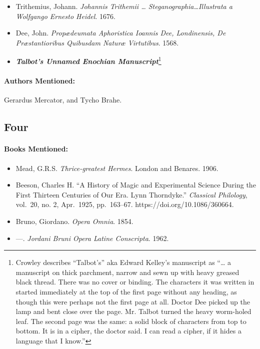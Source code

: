 \documentclass[12pt]{article}
\providecommand{\tightlist}{%
  \setlength{\itemsep}{0pt}\setlength{\parskip}{0pt}}
\begin{document}
\begin{itemize}
\tightlist
\item
  Trithemius, Johann. \emph{Johannis Trithemii \ldots{} Steganographia\ldots Illustrata a Wolfgango Ernesto Heidel}. 1676.
\item
  Dee, John. \emph{Propædeumata Aphoristica Ioannis Dee, Londinensis, De Præstantioribus Quibusdam Naturæ Virtutibus}. 1568.
\item
  \textbf{\emph{Talbot's Unnamed Enochian Manuscript}}\footnote{Crowley describes ``Talbot's'' aka Edward Kelley's manuscript as ``\ldots{} a manuscript on thick parchment, narrow and sewn up with heavy greased black thread. There was no cover or binding. The characters it was written in started immediately at the top of the first page without any heading, as though this were perhaps not the first page at all. Doctor Dee picked up the lamp and bent close over the page. Mr. Talbot turned the heavy worm-holed leaf. The second page was the same: a solid block of characters from top to bottom. It is in a cipher, the doctor said. I can read a cipher, if it hides a language that I know.''}
\end{itemize}

\paragraph{Authors Mentioned:}\label{authors-mentioned-7}

Gerardus Mercator, and Tycho Brahe.

\subsection{Four}\label{four-1}

\paragraph{Books Mentioned:}\label{books-mentioned-11}

\begin{itemize}
\tightlist
\item
  Mead, G.R.S. \emph{Thrice-greatest Hermes}. London and Benares. 1906.
\item
  Beeson, Charles H. ``A History of Magic and Experimental Science During the First Thirteen Centuries of Our Era. Lynn Thorndyke.'' \emph{Classical Philology}, vol.~20, no. 2, Apr.~1925, pp.~163--67. https://doi.org/10.1086/360664.
\item
  Bruno, Giordano. \emph{Opera Omnia}. 1854.
\item
  \! ---. \emph{Jordani Bruni Opera Latine Conscripta}. 1962.
\end{itemize}
\end{document}
